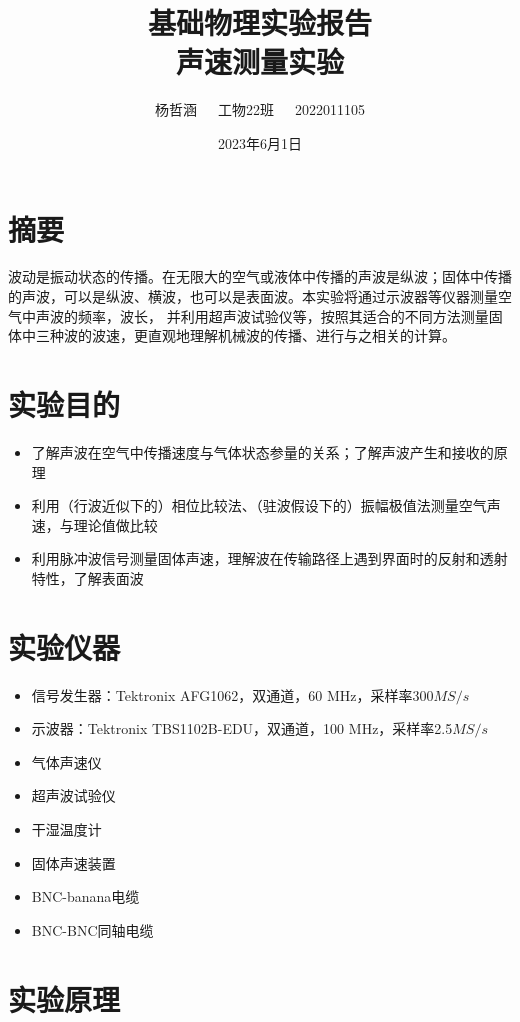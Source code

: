 \documentclass[UTF8,a4paper]{article}%
\title{\fontsize{14pt}{27pt}\selectfont%
    {\heiti%
        基础物理实验报告\\
        声速测量实验}}
\author{\fontsize{12pt}{18pt}\selectfont%
    {\kaishu%
    杨哲涵~~~工物22班~~~2022011105}}
\date{2023年6月1日}
\begin{document}
\maketitle
{}%
\chead{}%
\lfoot{}%
\cfoot{\thepage}%
\rfoot{}%
\section*{摘要}
波动是振动状态的传播。在无限大的空气或液体中传播的声波是纵波；固体中传播的声波，可以是纵波、横波，也可以是表面波。本实验将通过示波器等仪器测量空气中声波的频率，波长，
并利用超声波试验仪等，按照其适合的不同方法测量固体中三种波的波速，更直观地理解机械波的传播、进行与之相关的计算。
\section{实验目的}
\begin{itemize}
    \item 了解声波在空气中传播速度与气体状态参量的关系；了解声波产生和接收的原理
    \item 利用（行波近似下的）相位比较法、（驻波假设下的）振幅极值法测量空气声速，与理论值做比较
    \item 利用脉冲波信号测量固体声速，理解波在传输路径上遇到界面时的反射和透射特性，了解表面波
\end{itemize}
\section{实验仪器}
\begin{itemize}
    \item 信号发生器：Tektronix AFG1062，双通道，60 $\unit{\mega\hertz}$，采样率300$\unit{MS/s}$
    \item 示波器：Tektronix TBS1102B-EDU，双通道，100 $\unit{\mega\hertz}$，采样率2.5$\unit{MS/s}$
    \item 气体声速仪
    \item 超声波试验仪
    \item 干湿温度计
    \item 固体声速装置
    \item BNC-banana电缆
    \item BNC-BNC同轴电缆
\end{itemize}
\section{实验原理}
\end{document}
